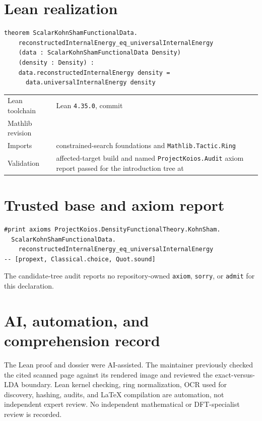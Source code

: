 \section{Lean realization}
\begin{lstlisting}
theorem ScalarKohnShamFunctionalData.
    reconstructedInternalEnergy_eq_universalInternalEnergy
    (data : ScalarKohnShamFunctionalData Density)
    (density : Density) :
    data.reconstructedInternalEnergy density =
      data.universalInternalEnergy density
\end{lstlisting}
\begin{tabularx}{\textwidth}{@{}lY@{}}
\toprule
Lean toolchain & Lean \texttt{4.35.0}, commit  \\
Mathlib revision &  \\
Imports & constrained-search foundations and \texttt{Mathlib.Tactic.Ring} \\
Validation & affected-target build and named \texttt{ProjectKoios.Audit} axiom report passed for the introduction tree at  \\
\bottomrule
\end{tabularx}

\section{Trusted base and axiom report}
\begin{lstlisting}
#print axioms ProjectKoios.DensityFunctionalTheory.KohnSham.
  ScalarKohnShamFunctionalData.
    reconstructedInternalEnergy_eq_universalInternalEnergy
-- [propext, Classical.choice, Quot.sound]
\end{lstlisting}
The candidate-tree audit reports no repository-owned \texttt{axiom}, \texttt{sorry}, or
\texttt{admit} for this declaration.

\section{AI, automation, and comprehension record}
The Lean proof and dossier were AI-assisted.  The maintainer previously checked the cited scanned
page against its rendered image and reviewed the exact-versus-LDA boundary.  Lean kernel checking,
ring normalization, OCR used for discovery, hashing, audits, and LaTeX compilation are automation,
not independent expert review.  No independent mathematical or DFT-specialist review is recorded.

